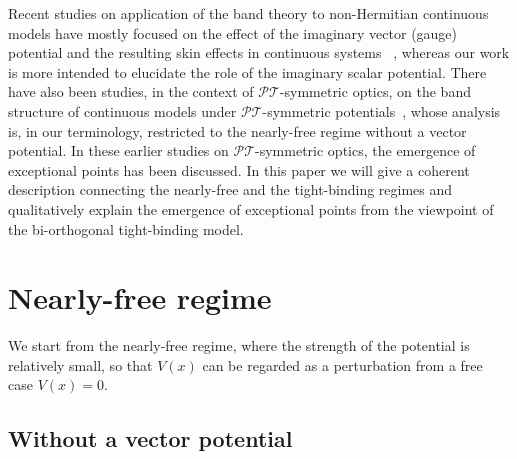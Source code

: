 \documentclass[prb,superscriptaddress,floatfix,twocolumn,showpacs]{revtex4-2}
\begin{document}
Recent studies on application of the band theory to non-Hermitian continuous models have mostly focused on the effect of the imaginary vector (gauge) potential and the resulting skin effects in continuous systems~ \cite{longhi2021non,yokomizo2021non}, whereas our work is more intended to elucidate the role of the imaginary scalar potential. 
There have also been studies, in the context of $\mathcal{PT}$-symmetric optics, on the band structure of continuous models under $\mathcal{PT}$-symmetric potentials~\cite{makris2008beam,guo2009observation,ruter2010observation}, whose analysis is, in our terminology, restricted to the nearly-free regime without a vector potential.
In these earlier studies on $\mathcal{PT}$-symmetric optics, the emergence of exceptional points has been discussed. 
In this paper we will give a coherent description connecting the nearly-free and the tight-binding regimes and qualitatively explain the emergence of exceptional points from the viewpoint of the bi-orthogonal tight-binding model. 

\section{Nearly-free regime}
\label{sec:nearly-free}
We start from the nearly-free regime, where the strength of the potential is relatively small, so that $V(x)$ can be regarded as a perturbation from a free case $V(x) = 0$.

\subsection{Without a vector potential}
\label{subsec:nearly-free_without-A}
\end{document}
